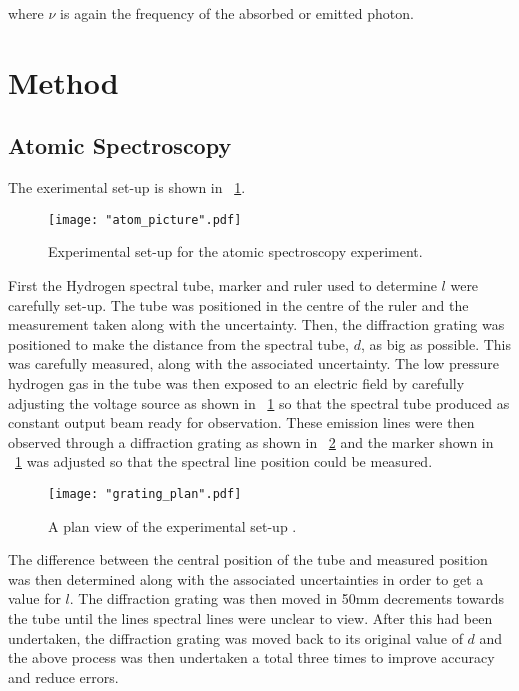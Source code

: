 \documentclass{article}
\newcommand{\figref}[2][\figurename~]{#1\ref{#2}}
\begin{document}
\vspace{2mm}
\noindent
where $\nu$ is again the frequency of the absorbed or emitted photon. 

\section{Method}
\label{sec:method}

\subsection{Atomic Spectroscopy}
\label{ssec:atomic-method}
The exerimental set-up is shown in \figref{fig:atom_picture}. 

\begin{figure}[h]
\centering
\texttt{[image: "atom\_picture".pdf]}
\caption{Experimental set-up for the atomic spectroscopy experiment.}
\label{fig:atom_picture}
\end{figure}

\noindent
First the Hydrogen spectral tube, marker and ruler used to determine $l$ were carefully set-up. The tube was positioned in the centre of the ruler and the measurement taken along with the uncertainty. Then, the diffraction grating was positioned to make the distance from the spectral tube, $d$, as big as possible. This was carefully measured, along with the associated uncertainty. The low pressure hydrogen gas in the tube was then exposed to an electric field by carefully adjusting the voltage source as shown in \figref{fig:atom_picture} so that the spectral tube produced as constant output beam ready for observation. These emission lines were then observed through a diffraction grating as shown in \figref{fig:grating_plan} and the marker shown in \figref{fig:atom_picture} was adjusted so that the spectral line position could be measured. 

\begin{figure}[h]
\centering
\texttt{[image: "grating\_plan".pdf]}
\caption{A plan view of the experimental set-up \cite{Paper01}.}
\label{fig:grating_plan}
\end{figure}

\vspace{2mm}
\noindent
The difference between the central position of the tube and measured position was then determined along with the associated uncertainties in order to get a value for $l$. The diffraction grating was then moved in 50mm decrements towards the tube until the lines spectral lines were unclear to view. After this had been undertaken, the diffraction grating was moved back to its original value of $d$ and the above process was then undertaken a total three times to improve accuracy and reduce errors.
\end{document}
